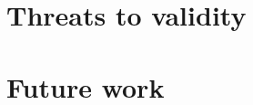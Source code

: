 \section{Threats to validity}
\begin{comment}
* Is the Ohloh database a representation of the world of OSS projects?
* Is LOC as the sum of source lines of code, comments, and blank lines valid?
* The use of LOC as a measure of project evolution. Does it represent
activity/growth/whatever to say something about the project's status?
* A selection criterion for the projects was a continuous series of subsequent
monthly facts. Maybe the full series of evolution data of a project is needed in
order to find objective signs or to be able to compare different projects.
* Is 250 projects enough to detect patterns and generalise to the world of OSS
projects?
* Is monthly aggregated data fine-grained enough?

\end{comment}

\section{Future work}


\begin{comment}
- Analyse results
- Conclude and interpret results
- Answer research questions
- Threats to validity
- Discussion
- Future work
 
This chapter contains the analysis and interpretation of the results. The
research questions are answered as best as possible given the results that were
obtained. The analysis also discussed parts of the questions that were left
unanswered.

An important topic is the validity of the results.
What methods of validation were used?
Could the results be generalized to other cases?
What threats to validity can be identified?

There is room here to discuss the results of related scientific literature here
as well.
How do the results obtained here relate to other work, and what consequences are
there?
Did your approach work better or worse?
Did you learn anything new compared to the already existing body of knowledge?
Finally, what could you say in hindsight on the research approach by followed?
What could have done better?
What lessons have been learned?
What could other researchers use from your experience?

A separate section should be devoted to ‘future work,’ i.e., possible extension
points of your work that you have identified. Other researchers (or yourself)
could use those as a starting point.

Refer to Chapters 3.7 and 4 in this example thesis at Paul’s
homepage\footnote{http://homepages.cwi.nl/~paulk/thesesMasterSoftwareEngineering/2006/ReneWiegers.pdf}.
\end{comment}
